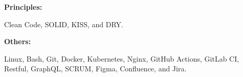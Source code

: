 \begin{minipage}[t]{0.47\textwidth}
    \begin{minipage}[t]{0.14\textwidth}
        \textbf{Principles:}
    \end{minipage}
    \hfill
    \begin{minipage}[t]{0.79\textwidth}
        Clean Code, SOLID, KISS, and DRY\@.
    \end{minipage}
    \vspace{4pt}

    \begin{minipage}[t]{0.14\textwidth}
        \textbf{Others:}
    \end{minipage}
    \hfill
    \begin{minipage}[t]{0.79\textwidth}
        Linux, Bash, Git, Docker, Kubernetes, Nginx, GitHub Actions, GitLab CI, Restful, GraphQL, SCRUM, Figma, Confluence, and Jira.
    \end{minipage}
    \vspace{4pt}

\end{minipage}
